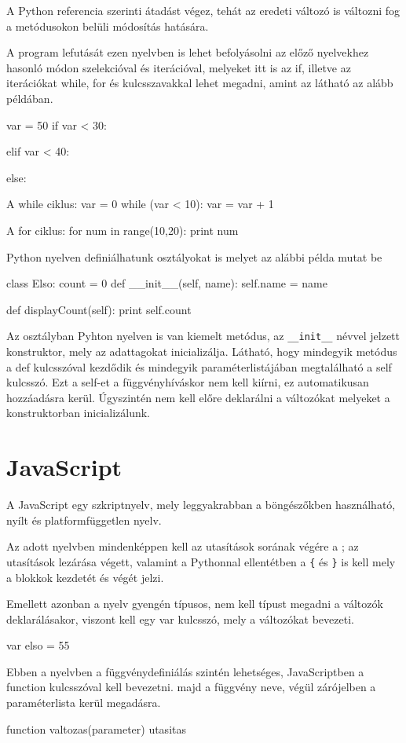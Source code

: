 A Python referencia szerinti átadást végez, tehát az eredeti változó is változni fog a metódusokon belüli módosítás hatására.

A program lefutását ezen nyelvben is lehet befolyásolni az előző nyelvekhez hasonló módon szelekcióval és iterációval, melyeket itt is az if, illetve az iterációkat while, for és kulcsszavakkal lehet megadni, amint az látható az alább példában.
\begin{python}
var = 50
if var < 30:

elif var < 40:

else:

A while ciklus:
var = 0
while (var < 10):
	var = var + 1

A for ciklus:
for num in range(10,20):
	print num
\end{python}

Python nyelven definiálhatunk osztályokat is melyet az alábbi példa mutat be
\begin{python}
class Elso:
	count = 0
	def __init__(self, name):
		self.name = name

	def displayCount(self):
		print self.count
\end{python}

Az osztályban Pyhton nyelven is van kiemelt metódus, az \texttt{\_\_init\_\_} névvel jelzett konstruktor, mely az adattagokat inicializálja. Látható, hogy mindegyik metódus a def kulcsszóval kezdődik és mindegyik paraméterlistájában megtalálható a self kulcsszó. Ezt a self-et a függvényhíváskor nem kell kiírni, ez automatikusan hozzáadásra kerül. Úgyszintén nem kell előre deklarálni a változókat melyeket a konstruktorban inicializálunk.

\section{JavaScript}

A JavaScript egy szkriptnyelv, mely leggyakrabban a böngészőkben használható, nyílt és platformfüggetlen nyelv.

Az adott nyelvben mindenképpen kell az utasítások sorának végére a ; az utasítások lezárása végett, valamint a Pythonnal ellentétben a \texttt{\{} és \texttt{\}} is kell mely a blokkok kezdetét és végét jelzi.

Emellett azonban a nyelv gyengén típusos, nem kell típust megadni a változók deklarálásakor, viszont kell egy var kulcsszó, mely a változókat bevezeti.
\begin{java}
var elso = 55
\end{java}
Ebben a nyelvben a függvénydefiniálás szintén lehetséges, JavaScriptben a function kulcsszóval kell bevezetni. majd a függvény neve, végül zárójelben a paraméterlista kerül megadásra.
\begin{java}
function valtozas(parameter) {
	utasitas
}
\end{java}

